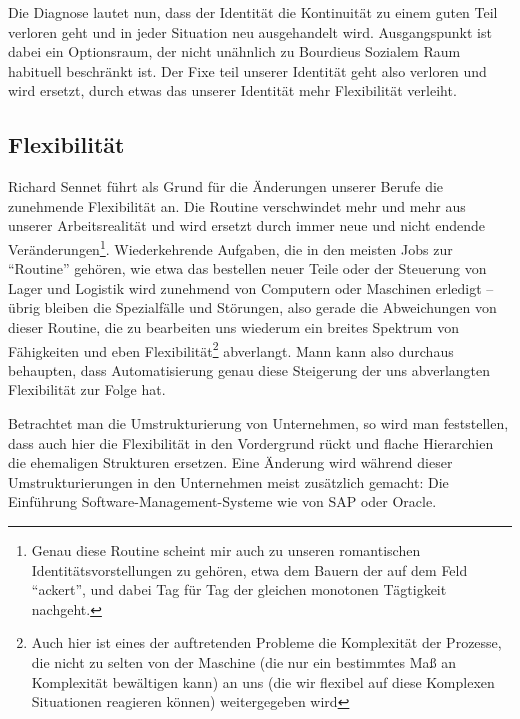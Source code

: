 Die Diagnose lautet nun, dass der Identität die Kontinuität zu einem guten Teil verloren geht und in jeder Situation neu ausgehandelt wird.
Ausgangspunkt ist dabei ein Optionsraum, der nicht unähnlich zu Bourdieus Sozialem Raum habituell beschränkt ist.
Der Fixe teil unserer Identität geht also verloren und wird ersetzt, durch etwas das unserer Identität mehr Flexibilität verleiht.

\subsection{Flexibilität}

Richard Sennet führt als Grund für die Änderungen unserer Berufe die zunehmende Flexibilität an.
Die Routine verschwindet mehr und mehr aus unserer Arbeitsrealität und wird ersetzt durch immer neue und nicht endende Veränderungen\footnote{Genau diese Routine scheint mir auch zu unseren romantischen Identitätsvorstellungen zu gehören, etwa dem Bauern der auf dem Feld \enquote{ackert}, und dabei Tag für Tag der gleichen monotonen Tägtigkeit nachgeht.}.
Wiederkehrende Aufgaben, die in den meisten Jobs zur \enquote{Routine} gehören, wie etwa das bestellen neuer Teile oder der Steuerung von Lager und Logistik wird zunehmend von Computern oder Maschinen erledigt – übrig bleiben die Spezialfälle und Störungen, also gerade die Abweichungen von dieser Routine, die zu bearbeiten uns wiederum ein breites Spektrum von Fähigkeiten und eben Flexibilität\footnote{Auch hier ist eines der auftretenden Probleme die Komplexität der Prozesse, die nicht zu selten von der Maschine (die nur ein bestimmtes Maß an Komplexität bewältigen kann) an uns (die wir flexibel auf diese Komplexen Situationen reagieren können) weitergegeben wird} abverlangt.
Mann kann also durchaus behaupten, dass Automatisierung genau diese Steigerung der uns abverlangten Flexibilität zur Folge hat.

Betrachtet man die Umstrukturierung von Unternehmen, so wird man feststellen, dass auch hier die Flexibilität in den Vordergrund rückt und flache Hierarchien die ehemaligen Strukturen ersetzen.
Eine Änderung wird während dieser Umstrukturierungen in den Unternehmen meist zusätzlich gemacht: Die Einführung Software-Management-Systeme wie von SAP oder Oracle.

